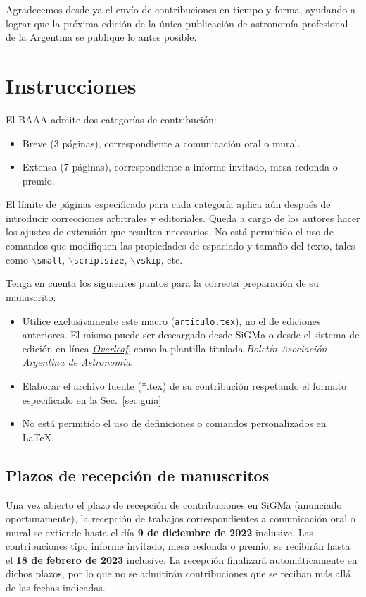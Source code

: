 \documentclass[baaa]{baaa}
\begin{document}
Agradecemos desde ya el envío de contribuciones en tiempo y forma, ayudando a lograr que la próxima edición de la única publicación de astronomía profesional de la Argentina se publique lo antes posible.

\section{Instrucciones}

El BAAA admite dos categorías de contribución:
\begin{itemize}
    \item Breve (3 páginas), correspondiente a comunicación oral o mural.
    \item Extensa (7 páginas), correspondiente a informe invitado, mesa redonda o premio.
\end{itemize}
El límite de páginas especificado para cada categoría aplica aún después de introducir correcciones arbitrales y editoriales. Queda a cargo de los autores hacer los ajustes de extensión que resulten necesarios. {No está permitido el uso de comandos que mo\-di\-fiquen las propiedades de espaciado y tamaño del texto}, tales como $\backslash${\tt small}, $\backslash${\tt scriptsize}, $\backslash${\tt vskip}, etc. 


Tenga en cuenta los siguientes puntos para la correcta preparación de su manuscrito:
\begin{itemize}
    \item Utilice exclusivamente este macro ({\tt articulo.tex}), no el de ediciones anteriores. El mismo puede ser descargado desde SiGMa o desde el sistema de edición en línea \href{https://www.overleaf.com/}{\emph{Overleaf}}, como la plantilla titulada  \emph{Boletín Asociación Argentina de Astronomía}.
   \item Elaborar el archivo fuente (*.tex) de su contribución respetando el formato especificado en la Sec.~\ref{sec:guia}      
   \item No está permitido el uso de definiciones o comandos personalizados en \LaTeX{}.
\end{itemize}

\subsection{Plazos de recepción de manuscritos}

Una vez abierto el plazo de recepción de contribuciones en SiGMa (anunciado oportunamente), la recepción de trabajos correspondientes a comunicación oral o mural se extiende hasta el día {\bf 9 de diciembre de 2022} inclusive. Las contribuciones tipo informe invitado, mesa redonda o premio, se recibirán hasta el {\bf 18 de febrero de 2023} inclusive. La recepción finalizará automáticamente en dichos plazos, por lo que no se admitirán contribuciones que se reciban más allá de las fechas indicadas.
\end{document}
